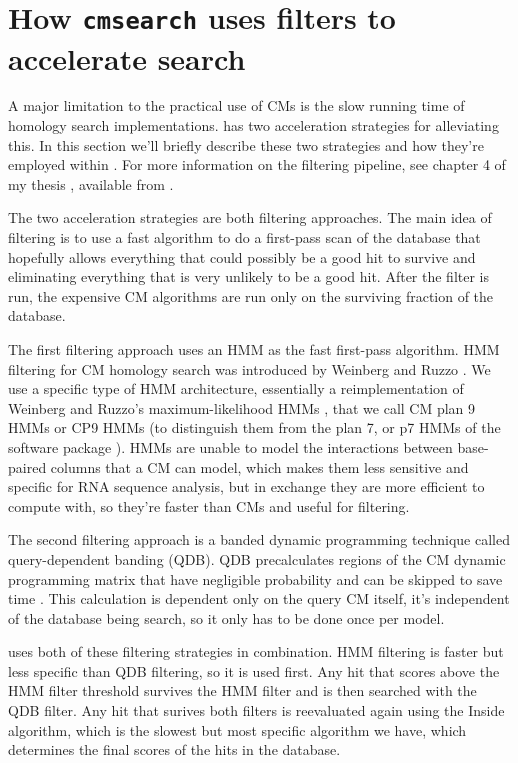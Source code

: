 \section{How \texttt{cmsearch} uses filters to accelerate search}

A major limitation to the practical use of CMs is the slow running
time of homology search implementations.  has two
acceleration strategies for alleviating this. In this section we'll
briefly describe these two strategies and how they're employed within
. For more information on the  filtering
pipeline, see chapter 4 of my thesis \cite{Nawrocki09b}, available
from .

The two acceleration strategies are both filtering approaches.  The
main idea of filtering is to use a fast algorithm to do a first-pass
scan of the database that hopefully allows everything that
could possibly be a good hit to survive and eliminating everything
that is very unlikely to be a good hit. After the filter is run, the
expensive CM algorithms are run only on the surviving fraction of the
database.

The first filtering approach uses an HMM as the fast first-pass
algorithm. HMM filtering for CM homology search was introduced by
Weinberg and Ruzzo
\cite{WeinbergRuzzo04,WeinbergRuzzo04b,WeinbergRuzzo06}. We use a
specific type of HMM architecture, essentially a reimplementation of
Weinberg and Ruzzo's maximum-likelihood HMMs \cite{WeinbergRuzzo06},
that we call CM plan 9 HMMs or CP9 HMMs (to distinguish them from the
plan 7, or p7 HMMs of the  software package
). HMMs
are unable to model the interactions between base-paired columns that
a CM can model, which makes them less sensitive and specific for RNA
sequence analysis, but in exchange they are more efficient to compute
with, so they're faster than CMs and useful for filtering.

The second filtering approach is a banded dynamic programming
technique called query-dependent banding (QDB). QDB precalculates
regions of the CM dynamic programming matrix that have negligible
probability and can be skipped to save time
\cite{NawrockiEddy07}. This calculation is dependent only on the query
CM itself, it's independent of the database being search, so it only
has to be done once per model. 

 uses both of these filtering strategies in
combination. HMM filtering is faster but less specific than QDB
filtering, so it is used first. Any hit that scores above the HMM
filter threshold survives the HMM filter and is then searched with the
QDB filter. Any hit that surives both filters is reevaluated again
using the Inside algorithm, which is the slowest but most specific
algorithm we have, which determines the final scores of the hits in
the database.


